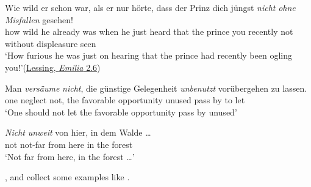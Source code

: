 \ea \label{ex:07-106}
\ea
\gll Wie wild er schon war, als er nur hörte, dass der Prinz dich jüngst \emph{nicht} \emph{ohne} \emph{Misfallen} gesehen!\\ %
 how wild he already was when he just heard that the prince you recently not without displeasure seen\\
\glt `How furious he was just on hearing that the prince had recently been ogling you!'\hfill(\href{https://archive.org/details/emiliagalottiein0000less_n9n0/page/51/mode/2up?q=%22wie+wild+er%22&view=theater}{Lessing, \textit{Emilia} 2.6})

\ex 
\gll Man \emph{versäume} \emph{nicht}, die günstige Gelegenheit \emph{unbenutzt} vorübergehen zu lassen.\\ %
 one neglect not, the favorable opportunity unused {pass by} to let\\
\glt `One should not let the favorable opportunity pass by unused'
\z
\z

\ea \label{ex:07-108}
\gll \emph{Nicht} \emph{unweit} von hier, in dem Walde {\dots}\\
 not {not-far} from here in the forest\\
\glt `Not far from here, in the forest {\dots}'
\z{}

\citet[\href{https://babel.hathitrust.org/cgi/pt?id=uiuo.ark:/13960/t4fn6hr38&seq=257}{241}]{siesbye1876småting}, and \citet[328]{mikkelsen1911ordföjningslære} collect some examples like . 

